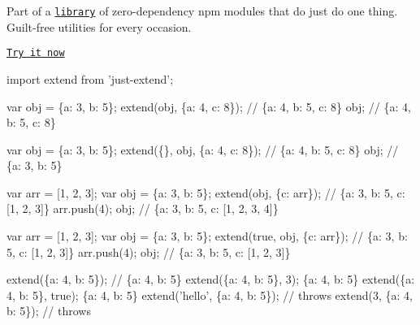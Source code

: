 Part of a \href{../../../../}{\tt library} of zero-\/dependency npm modules that do just do one thing. ~\newline
Guilt-\/free utilities for every occasion.

\href{http://anguscroll.com/just/just-extend}{\tt Try it now}


\begin{DoxyCode}
import extend from 'just-extend';

var obj = \{a: 3, b: 5\};
extend(obj, \{a: 4, c: 8\}); // \{a: 4, b: 5, c: 8\}
obj; // \{a: 4, b: 5, c: 8\}

var obj = \{a: 3, b: 5\};
extend(\{\}, obj, \{a: 4, c: 8\}); // \{a: 4, b: 5, c: 8\}
obj; // \{a: 3, b: 5\}

var arr = [1, 2, 3];
var obj = \{a: 3, b: 5\};
extend(obj, \{c: arr\}); // \{a: 3, b: 5, c: [1, 2, 3]\}
arr.push(4);
obj; // \{a: 3, b: 5, c: [1, 2, 3, 4]\}

var arr = [1, 2, 3];
var obj = \{a: 3, b: 5\};
extend(true, obj, \{c: arr\}); // \{a: 3, b: 5, c: [1, 2, 3]\}
arr.push(4);
obj; // \{a: 3, b: 5, c: [1, 2, 3]\}

extend(\{a: 4, b: 5\}); // \{a: 4, b: 5\}
extend(\{a: 4, b: 5\}, 3); \{a: 4, b: 5\}
extend(\{a: 4, b: 5\}, true); \{a: 4, b: 5\}
extend('hello', \{a: 4, b: 5\}); // throws
extend(3, \{a: 4, b: 5\}); // throws
\end{DoxyCode}
 